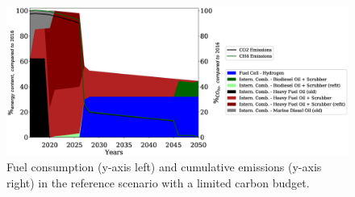\documentclass[article]{elsarticle}
\begin{document}
\begin{figure}
    \centering
    \includegraphics[width=\textwidth]{figures/RS_fuels_emissions.eps}
    \caption{Fuel consumption (y-axis left) and cumulative emissions (y-axis right) in the reference scenario with a limited carbon budget.}
    \label{fig:REF}
\end{figure}




\end{document}
